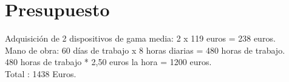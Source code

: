 %
%
%
%

\cleardoublepage
\chapter{Presupuesto}
\label{chap:budget}

	Adquisición de 2 dispositivos de gama media: 2 x 119 euros = 238 euros.\\
	Mano de obra: 60 días de trabajo x 8 horas diarias = 480 horas de trabajo.\\
	480 horas de trabajo * 2,50 euros la hora = 1200 euros.\\
	Total : 1438 Euros.